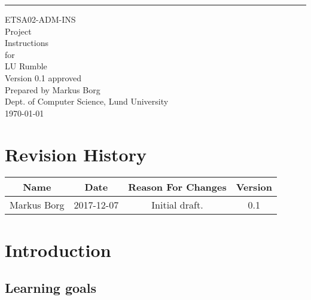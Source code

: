 \documentclass{scrreprt}
\date{}
\def\myversion{0.1 }
\begin{document}
\begin{flushright}
    \rule{16cm}{5pt}\vskip1cm
    \begin{bfseries}
    	\LARGE{ETSA02-ADM-INS}\\
    	\vspace{1.5cm}
        \Huge{Project\\ Instructions}\\
        \vspace{0.5cm}
        for\\
        \vspace{0.5cm}
        LU Rumble\\
        \vspace{1.5cm}
        \LARGE{Version \myversion approved}\\
        \vspace{1.5cm}
        Prepared by Markus Borg\\
        Dept. of Computer Science, Lund University\\
        \vspace{1.5cm}
        \today\\
    \end{bfseries}
\end{flushright}

\tableofcontents


\chapter*{Revision History}

\begin{center}
    \begin{tabular}{|c|c|c|c|}
        \hline
	    Name & Date & Reason For Changes & Version\\
        \hline
	    Markus Borg & 2017-12-07 & Initial draft. & 0.1\\
        \hline
    \end{tabular}
\end{center}

\chapter{Introduction}

\section{Learning goals}
\end{document}
